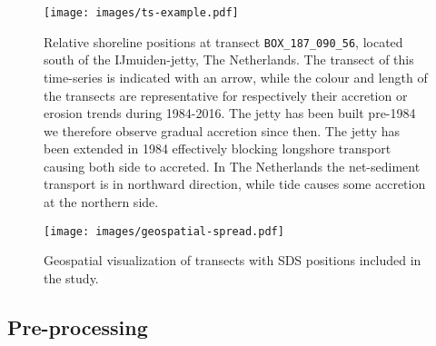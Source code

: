 \documentclass[format=sigconf, review=false, screen=true]{acmart}
\begin{document}
\begin{figure}[h]
	\centering
	\texttt{[image: images/ts-example.pdf]}
	\caption{Relative shoreline positions at transect \texttt{BOX\_187\_090\_56}, located south of the IJmuiden-jetty, The Netherlands. The transect of this time-series is indicated with an arrow, while the colour and length of the transects are representative for respectively their accretion or erosion trends during 1984-2016. The jetty has been built pre-1984 we therefore observe gradual accretion since then. The jetty has been extended in 1984 effectively blocking longshore transport causing both side to accreted. In The Netherlands the net-sediment transport is in northward direction, while tide causes some accretion at the northern side.}
	\label{fig:ts-example}
\end{figure}

\begin{figure}[h]
	\centering
	\texttt{[image: images/geospatial-spread.pdf]}
	\caption{Geospatial visualization of transects with SDS positions included in the study. }
	\label{fig:spatial-spread}
\end{figure}

\subsection{Pre-processing}
\end{document}
